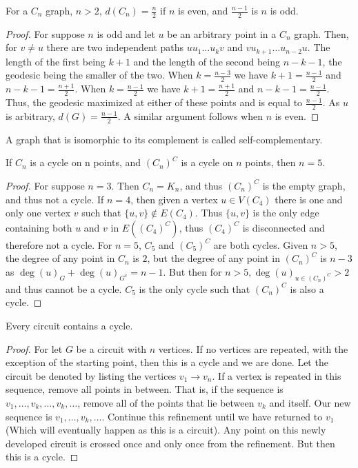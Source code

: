 \documentclass[crop=false,class=book,oneside]{standalone}
\begin{document}
        \begin{theorem}
        For a $C_n$ graph, $n>2$, $d(C_n) = \frac{n}{2}$ if $n$ is even, and $\frac{n-1}{2}$ is $n$ is odd.
        \end{theorem}
        \begin{proof}
        For suppose $n$ is odd and let $u$ be an arbitrary point in a $C_n$ graph. Then, for $v\ne u$ there are two independent paths $uu_1\hdots u_k v$ and $vu_{k+1}\hdots u_{n-2}u$. The length of the first being $k+1$ and the length of the second being $n-k-1$, the geodesic being the smaller of the two. When $k= \frac{n-3}{2}$ we have $k+1 = \frac{n-1}{2}$ and $n-k-1 = \frac{n+1}{2}$. When $k=\frac{n-1}{2}$ we have $k+1 = \frac{n+1}{2}$ and $n-k-1 = \frac{n-1}{2}$. Thus, the geodesic maximized at either of these points and is equal to $\frac{n-1}{2}$. As $u$ is arbitrary, $d(G) = \frac{n-1}{2}$. A similar argument follows when $n$ is even.
        \end{proof}
        \begin{definition}
        A graph that is isomorphic to its complement is called self-complementary.
        \end{definition}
        \begin{theorem}
        If $C_n$ is a cycle on n points, and $(C_n)^C$ is a cycle on $n$ points, then $n = 5$.
        \end{theorem}
        \begin{proof}
        For suppose $n=3$. Then $C_n = K_n$, and thus $(C_n)^C$ is the empty graph, and thus not a cycle. If $n = 4$, then given a vertex $u\in V(C_4)$ there is one and only one vertex $v$ such that $\{u,v\} \notin E(C_4)$. Thus $\{u,v\}$ is the only edge containing both $u$ and $v$ in $E((C_4)^C)$, thus $(C_4)^C$ is disconnected and therefore not a cycle. For $n=5$, $C_5$ and $(C_5)^C$ are both cycles. Given $n>5$, the degree of any point in $C_{n}$ is $2$, but the degree of any point in $(C_n)^C$ is $n-3$ as $\deg(u)_G + \deg(u)_{G^c} = n-1$. But then for $n>5, \deg(u)_{u\in (C_n)^C} > 2$ and thus cannot be a cycle. $C_5$ is the only cycle such that $(C_n)^C$ is also a cycle.
        \end{proof}
        \begin{theorem}
        Every circuit contains a cycle.
        \end{theorem}
        \begin{proof}
        For let $G$ be a circuit with $n$ vertices. If no vertices are repeated, with the exception of the starting point, then this is a cycle and we are done. Let the circuit be denoted by listing the vertices $v_1 \rightarrow v_n$. If a vertex is repeated in this sequence, remove all points in between. That is, if the sequence is $v_1,\hdots, v_k,\hdots, v_k, \hdots$, remove all of the points that lie between $v_k$ and itself. Our new sequence is $v_1, \hdots, v_k, \hdots$. Continue this refinement until we have returned to $v_1$ (Which will eventually happen as this is a circuit). Any point on this newly developed circuit is crossed once and only once from the refinement. But then this is a cycle.
        \end{proof}
\end{document}
